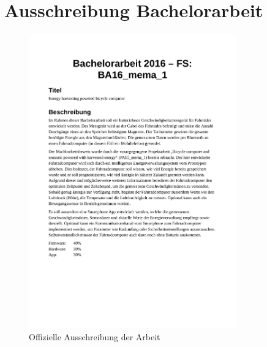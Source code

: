 
\appendix


\chapter{Ausschreibung Bachelorarbeit}

\begin{figure}[h]
    \includegraphics [width=0.8\textwidth] {7Anhang/docs/Ausschreibung.pdf} 
     \caption{Offizielle Ausschreibung der Arbeit}\label{Ausschreibung} 
\end{figure}



